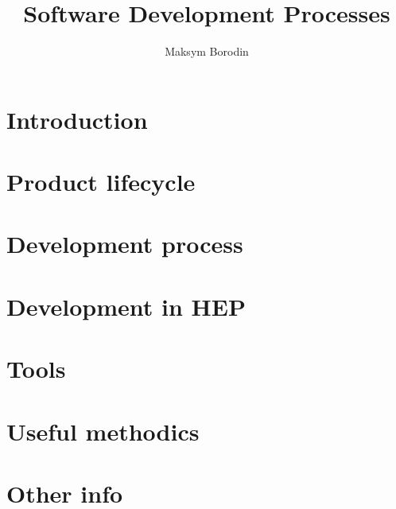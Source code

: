 \documentclass{beamer}
\title{Software Development Processes}
\author{Maksym Borodin}
\begin{document}
\frame{\titlepage}

\section{Introduction}


\section{Product lifecycle}


\section{Development process}


\section{Development in HEP}


\section{Tools}


\section{Useful methodics}


\section{Other info}

\end{document}
